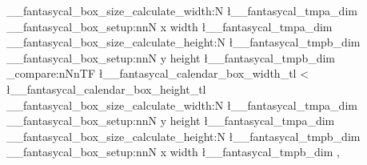 {{{{{                  }
                \__fantasycal_box_size_calculate_width:N \l__fantasycal_tmpa_dim
                \__fantasycal_box_setup:nnN { x } { width } \l__fantasycal_tmpa_dim
                \__fantasycal_box_size_calculate_height:N \l__fantasycal_tmpb_dim
                \__fantasycal_box_setup:nnN { y } { height } \l__fantasycal_tmpb_dim
                \dim_compare:nNnTF 
                  \l__fantasycal_calendar_box_width_tl 
                  < %
                  \l__fantasycal_calendar_box_height_tl
                  { 
                    \__fantasycal_box_size_calculate_width:N \l__fantasycal_tmpa_dim
                    \__fantasycal_box_setup:nnN { y } { height } \l__fantasycal_tmpa_dim
                  }{ 
                    \__fantasycal_box_size_calculate_height:N \l__fantasycal_tmpb_dim
                    \__fantasycal_box_setup:nnN { x } { width } \l__fantasycal_tmpb_dim
                  }
              }
          }{
          }
      } ,
  }

